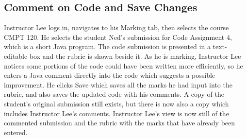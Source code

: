 \documentclass{article}
\begin{document}
\subsection{Comment on Code and Save Changes}
Instructor Lee logs in, navigates to his Marking tab, then selects the course CMPT 120.
He selects the student Ned’s submission for Code Assignment 4, which is a short Java
program. The code submission is presented in a text-editable box and the rubric is shown
beside it. As he is marking, Instructor Lee notices some portions of the code could have
been written more efficiently, so he enters a Java comment directly into the code which
suggests a possible improvement. He clicks Save which saves all the marks he had input
into the rubric, and also saves the updated code with his comments. A copy of the student’s
original submission still exists, but there is now also a copy which includes Instructor Lee’s
comments. Instructor Lee’s view is now still of the commented submission and the rubric with
the marks that have already been entered.
\end{document}
